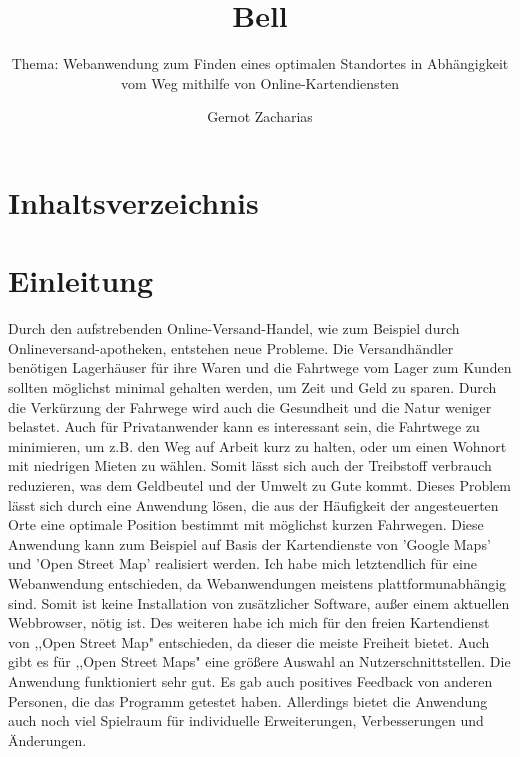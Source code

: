 \documentclass[a4paper, twoside, 12pt]{scrreprt}
\title{Bell}
\author{Gernot Zacharias}
\subtitle{Thema: Webanwendung zum Finden eines optimalen Standortes in Abhängigkeit vom Weg mithilfe von Online-Kartendiensten}
\begin{document}
\listoftodos
\maketitle
\cleardoublepage
\chapter {Inhaltsverzeichnis}
\setcounter{page}{1}
\chapter {Einleitung}
Durch den aufstrebenden Online-Versand-Handel, wie zum Beispiel durch
Onlineversand-apotheken, entstehen neue Probleme. Die Versandh\"andler
ben\"otigen Lagerh\"auser f\"ur ihre Waren und die Fahrtwege vom Lager zum
Kunden sollten m\"oglichst minimal gehalten werden, um Zeit und Geld zu
sparen. Durch die Verk\"urzung der Fahrwege wird auch die Gesundheit
und die Natur weniger belastet. Auch f\"ur Privatanwender kann es
interessant sein, die Fahrtwege zu minimieren, um z.B. den Weg auf
Arbeit kurz zu halten, oder um einen Wohnort mit niedrigen Mieten zu
w\"ahlen. Somit l\"asst sich auch der Treibstoff verbrauch reduzieren, was
dem Geldbeutel und der Umwelt zu Gute kommt. Dieses Problem l\"asst
sich durch eine Anwendung l\"osen, die aus der H\"aufigkeit der
angesteuerten Orte eine optimale Position bestimmt mit m\"oglichst kurzen
Fahrwegen. Diese Anwendung kann zum Beispiel auf Basis der
Kartendienste von 'Google Maps' und 'Open Street Map' realisiert
werden. Ich habe mich letztendlich f\"ur eine Webanwendung entschieden,
da Webanwendungen meistens plattformunabh\"angig sind. Somit ist keine
Installation von zus\"atzlicher Software, au\ss er einem aktuellen Webbrowser,
n\"otig ist. Des weiteren habe ich mich f\"ur den freien Kartendienst von
,,Open Street Map" entschieden, da dieser die meiste Freiheit bietet. Auch
gibt es f\"ur ,,Open Street Maps" eine gr\"o\ss ere Auswahl an
Nutzerschnittstellen. Die Anwendung funktioniert sehr gut. Es gab auch
positives Feedback von anderen Personen, die das Programm getestet
haben. Allerdings bietet die Anwendung auch noch viel Spielraum f\"ur
individuelle Erweiterungen, Verbesserungen und \"Anderungen.

\cleardoublepage
\end{document}
